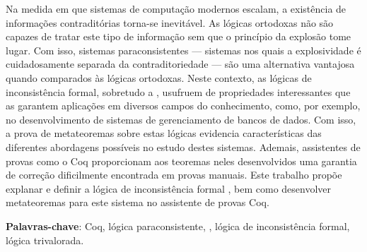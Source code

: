 
\setlength{\absparsep}{18pt} %
\begin{resumo}
    Na medida em que sistemas de computação modernos escalam, a existência de informações contraditórias torna-se inevitável. As lógicas ortodoxas não são capazes de tratar este tipo de informação sem que o princípio da explosão tome lugar. Com isso, sistemas paraconsistentes {---} sistemas nos quais a explosividade é cuidadosamente separada da contraditoriedade {---} são uma alternativa vantajosa quando comparados às lógicas ortodoxas. Neste contexto, as lógicas de inconsistência formal, sobretudo a \lfium{}, usufruem de propriedades interessantes que as garantem aplicações em diversos campos do conhecimento, como, por exemplo, no desenvolvimento de sistemas de gerenciamento de bancos de dados. Com isso, a prova de metateoremas sobre estas lógicas evidencia características das diferentes abordagens possíveis no estudo destes sistemas. Ademais, assistentes de provas como o Coq proporcionam aos teoremas neles desenvolvidos uma garantia de correção dificilmente encontrada em provas manuais. Este trabalho propõe explanar e definir a lógica de inconsistência formal \lfium{}, bem como desenvolver metateoremas para este sistema no assistente de provas Coq.

 \textbf{Palavras-chave}: Coq, lógica paraconsistente, \lfium{}, lógica de inconsistência formal, lógica trivalorada.
\end{resumo}
